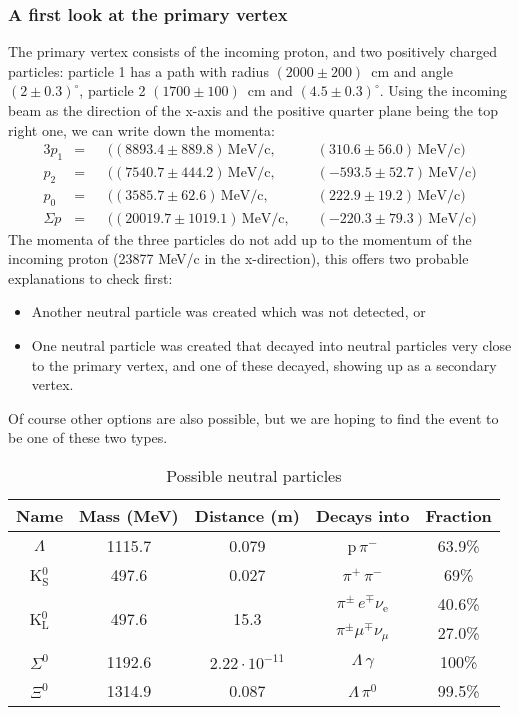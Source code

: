 \documentclass[twocolumn]{article}
\begin{document}
\subsubsection{A first look at the primary vertex}
The primary vertex consists of the incoming proton, and two positively charged particles: particle 1 has a path with radius $(2000 \pm 200)$~cm and angle $(2 \pm 0.3)^{\circ}$, particle 2 $(1700 \pm 100)$~cm and $(4.5 \pm 0.3)^{\circ}$. Using the incoming beam as the direction of the x-axis and the positive quarter plane being the top right one, we can write down the momenta:
\begin{alignat*}{3}
p_1 &= &&((8893.4 \pm 889.8)\, \text{MeV/c},\hspace{3pt} && (310.6 \pm 56.0)\, \text{MeV/c})\\
p_2 &= &&((7540.7 \pm 444.2)\, \text{MeV/c},\hspace{3pt} && (-593.5 \pm 52.7)\, \text{MeV/c})\\
p_0 &= &&((3585.7 \pm 62.6)\, \text{MeV/c},\hspace{3pt} && (222.9 \pm 19.2)\, \text{MeV/c})\\[6pt]
\Sigma p &= &&((20019.7 \pm 1019.1)\, \text{MeV/c},\hspace{3pt} && (-220.3 \pm 79.3)\, \text{MeV/c})
\end{alignat*}
The momenta of the three particles do not add up to the momentum of the incoming proton (23877 MeV/c in the x-direction), this offers two probable explanations to check first:
\begin{itemize}
\item Another neutral particle was created which was not detected, or
\item One neutral particle was created that decayed into neutral particles very close to the primary vertex, and one of these decayed, showing up as a secondary vertex.
\end{itemize}
Of course other options are also possible, but we are hoping to find the event to be one of these two types.\\
\iffalse
\begin{table}
\centering
\begin{tabular}{|c|c|c|c|c|}
\hline
Name & Mass (MeV) & Distance (m) & Decays into & Fraction \\
\hline
$\Lambda$ 	& 1115.7 & 0.079 &p$\, \pi^-$ & 63.9\%\\
\hline
K$^0_{\text{S}}$	 & 497.6 & 0.027 & $\pi^+ \, \pi^-$ & 69\%\\
\hline
\multirow{2}{*}{K$^0_{\text{L}}$} &  \multirow{2}{*}{ 497.6}& \multirow{2}{*}{15.3}&$\pi^{\pm} \, e^{\mp} \nu_{\text{e}}$ & 40.6\%\\
 & & &$\pi^{\pm} \mu ^{\mp} \nu_{\mu}$&27.0\%\\
\hline
$\Sigma^0$ & 1192.6 & $2.22 \cdot 10^{-11}$& $\Lambda \, \gamma$ & 100\%\\
\hline
$\Xi^0$ & 1314.9 & 0.087 & $\Lambda \, \pi^0$ & 99.5\%\\
\hline
\end{tabular}
\caption{Possible neutral particles\cite{pdg}}
\label{tab:neutral}
\end{table}
\end{document}
